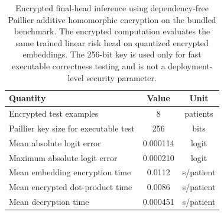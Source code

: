 \begin{table}[t]
\centering
\caption{Encrypted final-head inference using dependency-free Paillier additive homomorphic encryption on the bundled benchmark. The encrypted computation evaluates the same trained linear risk head on quantized encrypted embeddings. The 256-bit key is used only for fast executable correctness testing and is not a deployment-level security parameter.}
\label{tab:crypto_results}
\small
\begin{tabular}{lcc}
\toprule
Quantity & Value & Unit \\
\midrule
Encrypted test examples & 8 & patients \\
Paillier key size for executable test & 256 & bits \\
Mean absolute logit error & 0.000114 & logit \\
Maximum absolute logit error & 0.000210 & logit \\
Mean embedding encryption time & 0.0112 & s/patient \\
Mean encrypted dot-product time & 0.0086 & s/patient \\
Mean decryption time & 0.000451 & s/patient \\
\bottomrule
\end{tabular}
\end{table}